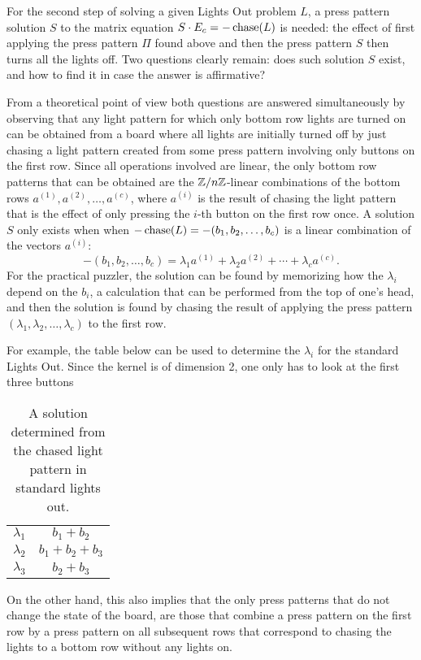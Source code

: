 For the second step of solving a given Lights Out problem
$L$, a press pattern solution $S$ to the matrix
equation $S\cdot E_c=-\operatorname{chase}(L)$ is needed:
the effect of first applying the press pattern
$\Pi$ found above and then the press pattern $S$ then turns all the lights off.
Two questions clearly remain: does such solution $S$ exist, and how
to find it in case the answer is affirmative?

From a theoretical point of view
both questions are answered simultaneously by observing that
any light pattern for which only bottom row lights are turned on
can be obtained from a board where all lights are initially turned off
by just chasing a light pattern created from some
press pattern involving only buttons on the first row.
Since all operations involved are linear, the only bottom row patterns
that can be obtained are the $\mathbb{Z}/n\mathbb{Z}$-linear combinations of the
bottom rows $a^{(1)}, a^{(2)}, \ldots, a^{(c)}$, where $a^{(i)}$ is the result of
chasing the light pattern that is the effect of only pressing the $i$-th
button on the first row once. A solution $S$ only exists when
when $-\operatorname{chase}(L)=-(b_1, b_2, \ldots, b_c)$ is a linear combination
of the vectors $a^{(i)}$:
$$-(b_1, b_2, \ldots, b_c)=\lambda_1a^{(1)}+\lambda_2a^{(2)}+\cdots+\lambda_ca^{(c)}.$$
For the practical puzzler, the solution can be found by memorizing how the $\lambda_{i}$ depend on the $b_{i}$,
a calculation that can be performed from the top of one's head, and then the solution is found
by chasing the result of applying the press pattern 
$(\lambda_1, \lambda_2, \ldots, \lambda_c)$ to the first row.

For example, the table below can be used to determine the $\lambda_{i}$ for the standard Lights Out. Since the kernel is of dimension 2, one only has to look at the first three buttons

\begin{table}
  \begin{center}
    \begin{tabular}{|c|c|}
      \hline
      \hline
$\lambda_1$ & $b_1 + b_2$\\
$\lambda_2$ & $b_1 + b_2 + b_3$\\
$\lambda_3$ & $b_2 + b_3$\\
        \hline
    \end{tabular}
  \end{center}
  \caption{A solution determined from the chased light pattern in standard lights out.}
  \label{tab:solution}
\end{table}

On the other hand, this also implies that the only press patterns
that do not change the state of the board, are those that combine
a press pattern on the first row by a press pattern on all subsequent
rows that correspond to chasing the lights to a bottom row without any
lights on.

